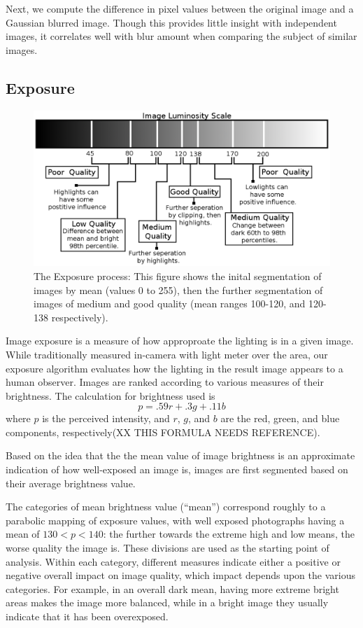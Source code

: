 \documentclass{article}
\begin{document}
Next, we compute the difference in pixel values between the original image and a Gaussian blurred image. Though this provides little insight with independent images, it correlates well with blur amount when comparing the subject of similar images.

\subsection{Exposure}
\begin{figure}
  \centering
    \includegraphics[scale=0.53,clip]{imageluminosity.eps}
    \caption{The Exposure process: This figure shows the inital segmentation of images by mean (values 0 to 255), then the further segmentation of images of medium and good quality (mean ranges 100-120, and 120-138 respectively).}
    \label{exposurefigure}
\end{figure}
Image exposure is a measure of how approproate the lighting is in a given image.  While traditionally measured in-camera with light meter over the area, our exposure algorithm evaluates how the lighting in the result image appears to a human observer.  Images are ranked according to various measures of their brightness. The calculation for brightness used is
\[
p=.59r+.3g+.11b
\]
where \(p\) is the perceived intensity, and \(r\), \(g\), and \(b\) are the red, green, and blue components, respectively(XX THIS FORMULA NEEDS REFERENCE).

Based on the idea that the the mean value of image brightness is an approximate indication of how well-exposed an image is, images are first segmented based on their average brightness value.

The categories of mean brightness value (“mean”) correspond roughly to a parabolic mapping of exposure values, with well exposed photographs having a mean of \(130<p<140\): the further towards the extreme high and low means, the worse quality the image is. These divisions are used as the starting point of analysis. Within each category, different measures indicate either a positive or negative overall impact on image quality, which impact depends upon the various categories. For example, in an overall dark mean, having more extreme bright areas makes the image more balanced, while in a bright image they usually indicate that it has been overexposed.
\end{document}

